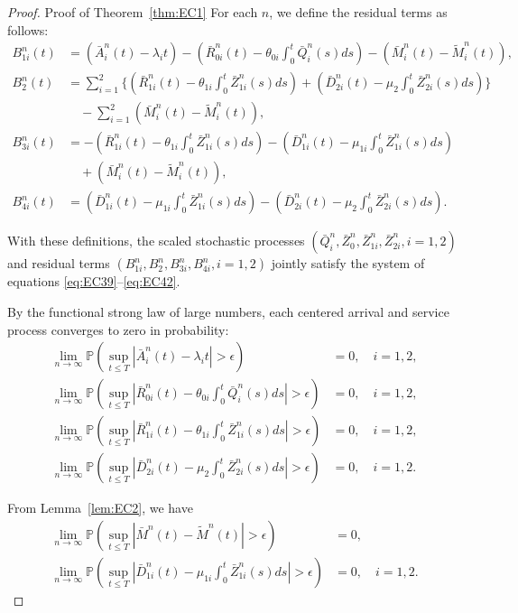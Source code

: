 \begin{proof}{Proof of Theorem~\ref{thm:EC1}}
For each $n$, we define the residual terms as follows:
\begin{align*}
B^n_{1i}(t) &= (\bar{A}^n_i(t) - \lambda_i t) - (\bar{R}^n_{0i}(t) - \theta_{0i} \int_0^t \bar{Q}^n_i(s)ds) - (\bar{M}^n_i(t) - \tilde{M}^n_i(t)), \\
B^n_2(t) &= \sum_{i=1}^{2} \{(\bar{R}^n_{1i}(t) - \theta_{1i} \int_0^t \bar{Z}^n_{1i}(s)ds) + (\bar{D}^n_{2i}(t) - \mu_2 \int_0^t \bar{Z}^n_{2i}(s)ds)\} \\
&\quad - \sum_{i=1}^{2}(\bar{M}^n_i(t) - \tilde{M}^n_i(t)), \\
B^n_{3i}(t) &= -(\bar{R}^n_{1i}(t) - \theta_{1i} \int_0^t \bar{Z}^n_{1i}(s)ds) - (\bar{D}^n_{1i}(t) - \mu_{1i} \int_0^t \bar{Z}^n_{1i}(s)ds) \\
&\quad + (\bar{M}^n_i(t) - \tilde{M}^n_i(t)), \\
B^n_{4i}(t) &= (\bar{D}^n_{1i}(t) - \mu_{1i} \int_0^t \bar{Z}^n_{1i}(s)ds) - (\bar{D}^n_{2i}(t) - \mu_2 \int_0^t \bar{Z}^n_{2i}(s)ds).
\end{align*}

With these definitions, the scaled stochastic processes $(\bar{Q}^n_i, \bar{Z}^n_0, \bar{Z}^n_{1i}, \bar{Z}^n_{2i}, i=1,2)$ and residual terms $(B^n_{1i}, B^n_2, B^n_{3i}, B^n_{4i}, i=1,2)$ jointly satisfy the system of equations \eqref{eq:EC39}--\eqref{eq:EC42}.

By the functional strong law of large numbers, each centered arrival and service process converges to zero in probability:
\begin{align*}
\lim_{n \to \infty} \mathbb{P}\left(\sup_{t \le T} |\bar{A}^n_i(t) - \lambda_i t| > \epsilon\right) &= 0, \quad i=1,2, \\
\lim_{n \to \infty} \mathbb{P}\left(\sup_{t \le T} \left|\bar{R}^n_{0i}(t) - \theta_{0i} \int_0^t \bar{Q}^n_i(s)ds\right| > \epsilon\right) &= 0, \quad i=1,2, \\
\lim_{n \to \infty} \mathbb{P}\left(\sup_{t \le T} \left|\bar{R}^n_{1i}(t) - \theta_{1i} \int_0^t \bar{Z}^n_{1i}(s)ds\right| > \epsilon\right) &= 0, \quad i=1,2, \\
\lim_{n \to \infty} \mathbb{P}\left(\sup_{t \le T} \left|\bar{D}^n_{2i}(t) - \mu_2 \int_0^t \bar{Z}^n_{2i}(s)ds\right| > \epsilon\right) &= 0, \quad i=1,2.
\end{align*}

From Lemma~\ref{lem:EC2}, we have
\begin{align*}
\lim_{n \to \infty} \mathbb{P}\left(\sup_{t \le T} |\bar{M}^n(t) - \tilde{M}^n(t)| > \epsilon\right) &= 0, \\
\lim_{n \to \infty} \mathbb{P}\left(\sup_{t \le T} \left|\bar{D}^n_{1i}(t) - \mu_{1i} \int_0^t \bar{Z}^n_{1i}(s)ds\right| > \epsilon\right) &= 0, \quad i=1,2.
\end{align*}


\end{proof}
